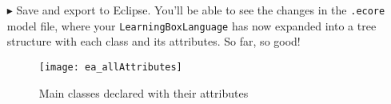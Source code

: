 \begin{itemize}
\vspace{0.5cm}

\item[$\blacktriangleright$] Save and export to Eclipse. You'll be able to see the changes in the \texttt{.ecore} model file, where
your \texttt{LearningBoxLanguage} has now expanded into a tree structure with each class and its attributes. So far, so good!

\newpage

\vspace*{3cm}


\begin{figure}[htbp]
	\centering
  \texttt{[image: ea\_allAttributes]}
	\caption{Main classes declared with their attributes}
	\label{fig:attribute_completed}
\end{figure}
\FloatBarrier

\end{itemize}
